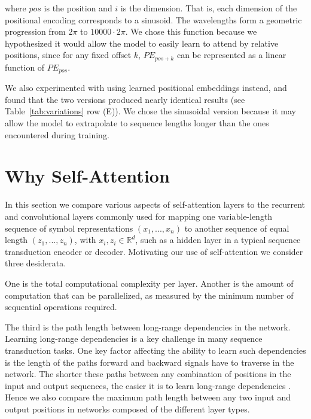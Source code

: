 \documentclass{article}
\begin{document}
where $pos$ is the position and $i$ is the dimension.  That is, each dimension of the positional encoding corresponds to a sinusoid.  The wavelengths form a geometric progression from $2\pi$ to $10000 \cdot 2\pi$.  We chose this function because we hypothesized it would allow the model to easily learn to attend by relative positions, since for any fixed offset $k$, $PE_{pos+k}$ can be represented as a linear function of $PE_{pos}$.

We also experimented with using learned positional embeddings \citep{JonasFaceNet2017} instead, and found that the two versions produced nearly identical results (see Table~\ref{tab:variations} row (E)).  We chose the sinusoidal version because it may allow the model to extrapolate to sequence lengths longer than the ones encountered during training.


 
\section{Why Self-Attention}


In this section we compare various aspects of self-attention layers to the recurrent and convolutional layers commonly used for mapping one variable-length sequence of symbol representations $(x_1, ..., x_n)$ to another sequence of equal length $(z_1, ..., z_n)$, with $x_i, z_i \in \mathbb{R}^d$, such as a hidden layer in a typical sequence transduction encoder or decoder. Motivating our use of self-attention we consider three desiderata.

One is the total computational complexity per layer.
Another is the amount of computation that can be parallelized, as measured by the minimum number of sequential operations required.

The third is the path length between long-range dependencies in the network. Learning long-range dependencies is a key challenge in many sequence transduction tasks. One key factor affecting the ability to learn such dependencies is the length of the paths forward and backward signals have to traverse in the network. The shorter these paths between any combination of positions in the input and output sequences, the easier it is to learn long-range dependencies \citep{hochreiter2001gradient}. Hence we also compare the maximum path length between any two input and output positions in networks composed of the different layer types.
\end{document}

